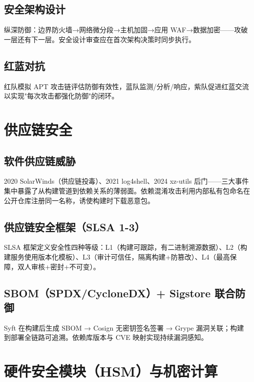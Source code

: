 \documentclass[12pt,UTF8]{ctexbook}
\begin{document}
  \section{安全架构设计}

纵深防御：边界防火墙→网络微分段→主机加固→应用 WAF→数据加密——攻破一层还有下一层。安全设计审查应在首次架构决策时同步执行。

  \section{红蓝对抗}

红队模拟 APT 攻击链评估防御有效性，蓝队监测/分析/响应，紫队促进红蓝交流以实现"每次攻击都强化防御"的闭环。

\chapter{供应链安全}
\label{chap:supply-chain-security}

  \section{软件供应链威胁}

2020 SolarWinds（供应链投毒）、2021 log4shell、2024 xz-utils 后门——三大事件集中暴露了从构建管道到依赖关系的薄弱面。依赖混淆攻击利用内部私有包命名在公开仓库注册同一名称，诱使构建时下载恶意包。

  \section{供应链安全框架（SLSA 1-3）}

SLSA 框架定义安全性四种等级：L1（构建可跟踪，有二进制溯源数据）、L2（构建服务使用版本化模板）、L3（审计可信任，隔离构建+防篡改）、L4（最高保障，双人审核+密封+不可变）。

  \section{SBOM（SPDX/CycloneDX）+ Sigstore 联合防御}

Syft 在构建后生成 SBOM → Cosign 无密钥签名签署 → Grype 漏洞关联；构建到部署全链路可追溯。依赖库版本与 CVE 映射实现持续漏洞感知。


\chapter{硬件安全模块（HSM）与机密计算}
\label{chap:hsm-confidential}
\end{document}
